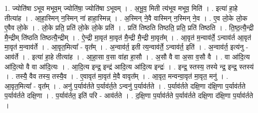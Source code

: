 \documentclass[17pt]{extarticle}
\begin{document}
1. ज्योति॑षा ऽभूव मभूव॒म् ज्योति॑षा॒ ज्योति॑षा ऽभूवम् । . अ॒भू॒व॒ मिती त्य॑भूव मभूव॒ मिति॑ । . इत्या॑ हा॒हे तीत्या॑ह । . आ॒हा॒स्मिन् न॒स्मिन् ना॑ हाहा॒स्मिन्न् । . अ॒स्मिन् ने॒वै वास्मिन् न॒स्मिन् ने॒व । . ए॒व लो॒के लो॒क ए॒वैव लो॒के । . लो॒के प्रति॒ प्रति॑ लो॒के लो॒के प्रति॑ । . प्रति॑ तिष्ठति तिष्ठति॒ प्रति॒ प्रति॑ तिष्ठति । . ति॒ष्ठ॒त्यै॒न्द्री मै॒न्द्रीम् ति॑ष्ठति तिष्ठत्यै॒न्द्रीम् । . ऐ॒न्द्री मा॒वृत॑ मा॒वृत॑ मै॒न्द्री मै॒न्द्री मा॒वृत᳚म् । . आ॒वृत॑ म॒न्वाव॑र्ते॒ ऽन्वाव॑र्त आ॒वृत॑ मा॒वृत॑ म॒न्वाव॑र्ते । . आ॒वृत॒मित्या᳚ - वृत᳚म् । . अ॒न्वाव॑र्त॒ इती त्य॒न्वाव॑र्ते॒ ऽन्वाव॑र्त॒ इति॑ । . अ॒न्वाव॑र्त॒ इत्य॑नु - आव॑र्ते । . इत्या॑ हा॒हे तीत्या॑ह । . आ॒हा॒सा व॒सा वा॑हा हा॒सौ । . अ॒सौ वै वा अ॒सा व॒सौ वै । . वा आ॑दि॒त्य आ॑दि॒त्यो वै वा आ॑दि॒त्यः । . आ॒दि॒त्य इन्द्र॒ इन्द्र॑ आदि॒त्य आ॑दि॒त्य इन्द्रः॑ । . इन्द्र॒ स्तस्य॒ तस्ये न्द्र॒ इन्द्र॒ स्तस्य॑ । . तस्यै॒ वैव तस्य॒ तस्यै॒व । . ए॒वावृत॑ मा॒वृत॑ मे॒वै वावृत᳚म् । . आ॒वृत॒ मन्वन्वा॒वृत॑ मा॒वृत॒ मनु॑ । . आ॒वृत॒मित्या᳚ - वृत᳚म् । . अनु॑ प॒र्याव॑र्तते प॒र्याव॑र्त॒ते ऽन्वनु॑ प॒र्याव॑र्तते । . प॒र्याव॑र्तते दक्षि॒णा द॑क्षि॒णा प॒र्याव॑र्तते प॒र्याव॑र्तते दक्षि॒णा । . प॒र्याव॑र्तत॒ इति॑ परि - आव॑र्तते । . द॒क्षि॒णा प॒र्याव॑र्तते प॒र्याव॑र्तते दक्षि॒णा द॑क्षि॒णा प॒र्याव॑र्तते । \newline
\end{document}
